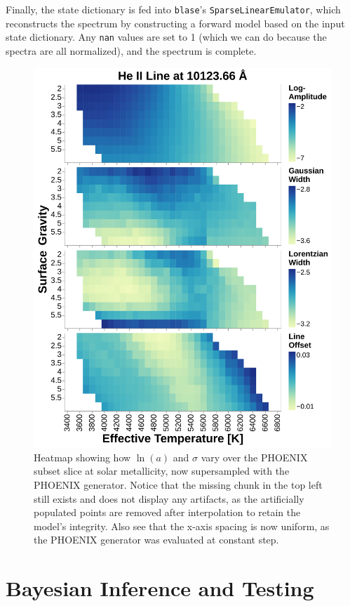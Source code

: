 \documentclass[twocolumn]{aastex631}
\begin{document}
Finally, the state dictionary is fed into \texttt{blase}'s \texttt{SparseLinearEmulator},
which reconstructs the spectrum by constructing a forward model based on 
the input state dictionary. Any \texttt{nan} values are set to 1 (which we 
can do because the spectra are all normalized), and the spectrum is 
complete.

\begin{figure}
    \centering
    \includegraphics[width=\textwidth]{figure4}
    \caption{Heatmap showing how $\ln(a)$ and $\sigma$ vary over the PHOENIX 
    subset slice at solar metallicity, now supersampled with the PHOENIX 
    generator. Notice that the missing chunk in the top left still exists 
    and does not display any artifacts, as the artificially populated points 
    are removed after interpolation to retain the model's integrity. Also
    see that the x-axis spacing is now uniform, as the PHOENIX generator 
    was evaluated at constant step.}
\end{figure}

\section{Bayesian Inference and Testing}
\end{document}
